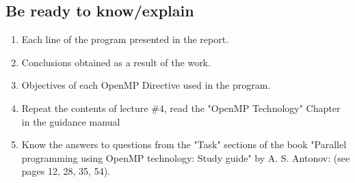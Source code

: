 { %
	\subsection{Be ready to know/explain}
	\begin{enumerate}
		\item Each line of the program presented in the report.
		\item Conclusions obtained as a result of the work.
		\item Objectives of each OpenMP Directive used in the program.
		\item Repeat the contents of lecture \#4, read the "OpenMP Technology" Chapter in the guidance manual
		\item Know the answers to questions from the "Task" sections of the book 
		"Parallel programming using OpenMP technology: Study guide" by A. S. Antonov:  (see pages 12, 28, 35, 54).
		
	\end{enumerate}
}